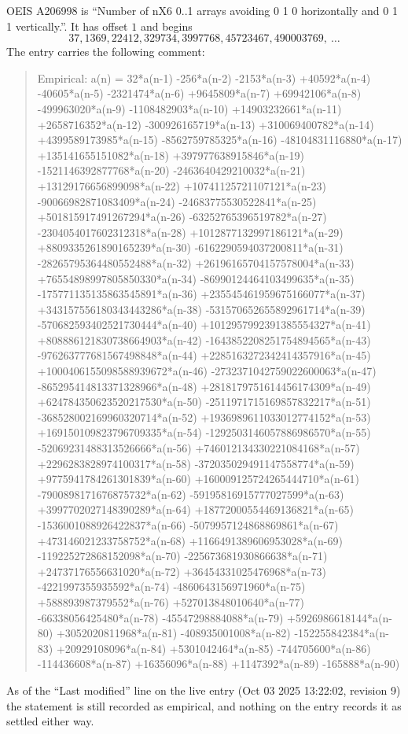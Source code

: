 \documentclass[11pt,a4paper]{article}
\theoremstyle{plain}
\theoremstyle{definition}
\begin{document}
OEIS A206998 is ``Number of nX6 0..1 arrays avoiding 0 1 0 horizontally and 0 1 1 vertically.''. It has offset
$1$ and begins
\[
37, 1369, 22412, 329734, 3997768, 45723467, 490003769,\ \dots
\]
The entry carries the following comment:
\begin{quote}\small
Empirical: a(n) = 32*a(n-1) -256*a(n-2) -2153*a(n-3) +40592*a(n-4) -40605*a(n-5) -2321474*a(n-6) +9645809*a(n-7) +69942106*a(n-8) -499963020*a(n-9) -1108482903*a(n-10) +14903232661*a(n-11) +2658716352*a(n-12) -300926165719*a(n-13) +310069400782*a(n-14) +4399589173985*a(n-15) -8562759785325*a(n-16) -48104831116880*a(n-17) +135141655151082*a(n-18) +397977638915846*a(n-19) -1521146392877768*a(n-20) -2463640429210032*a(n-21) +13129176656899098*a(n-22) +10741125721107121*a(n-23) -90066982871083409*a(n-24) -24683775530522841*a(n-25) +501815917491267294*a(n-26) -63252765396519782*a(n-27) -2304054017602312318*a(n-28) +1012877132997186121*a(n-29) +8809335261890165239*a(n-30) -6162290594037200811*a(n-31) -28265795364480552488*a(n-32) +26196165704157578004*a(n-33) +76554898997805850330*a(n-34) -86990124464103499635*a(n-35) -175771135135863545891*a(n-36) +235545461959675166077*a(n-37) +343157556180343443286*a(n-38) -531570652655892961714*a(n-39) -570682593402521730444*a(n-40) +1012957992391385554327*a(n-41) +808886121830738664903*a(n-42) -1643852208251754894565*a(n-43) -976263777681567498848*a(n-44) +2285163272342414357916*a(n-45) +1000406155098588939672*a(n-46) -2732371042759022600063*a(n-47) -865295414813371328966*a(n-48) +2818179751614456174309*a(n-49) +624784350623520217530*a(n-50) -2511971715169857832217*a(n-51) -368528002169960320714*a(n-52) +1936989611033012774152*a(n-53) +169150109823796709335*a(n-54) -1292503146057886986570*a(n-55) -52069231488313526666*a(n-56) +746012134330221084168*a(n-57) +2296283828974100317*a(n-58) -372035029491147558774*a(n-59) +9775941784261301839*a(n-60) +160009125724265444710*a(n-61) -7900898171676875732*a(n-62) -59195816915777027599*a(n-63) +3997702027148390289*a(n-64) +18772000554469136821*a(n-65) -1536001088926422837*a(n-66) -5079957124868869861*a(n-67) +473146021233758752*a(n-68) +1166491389606953028*a(n-69) -119225272868152098*a(n-70) -225673681930866638*a(n-71) +24737176556631020*a(n-72) +36454331025476968*a(n-73) -4221997355935592*a(n-74) -4860643156971960*a(n-75) +588893987379552*a(n-76) +527013848010640*a(n-77) -66338056425480*a(n-78) -45547298884088*a(n-79) +5926986618144*a(n-80) +3052020811968*a(n-81) -408935001008*a(n-82) -152255842384*a(n-83) +20929108096*a(n-84) +5301042464*a(n-85) -744705600*a(n-86) -114436608*a(n-87) +16356096*a(n-88) +1147392*a(n-89) -165888*a(n-90)
\end{quote}
As of the ``Last modified'' line on the live entry (Oct 03 2025 13:22:02, revision
9) the statement is still recorded as empirical, and nothing on the entry
records it as settled either way.
\end{document}
